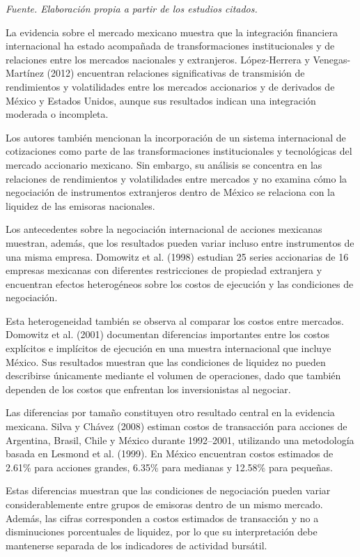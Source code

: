 \emph{Fuente. Elaboración propia a partir de los estudios citados.}

La evidencia sobre el mercado mexicano muestra que la integración financiera internacional ha estado acompañada de transformaciones institucionales y de relaciones entre los mercados nacionales y extranjeros. López-Herrera y Venegas-Martínez (2012) encuentran relaciones significativas de transmisión de rendimientos y volatilidades entre los mercados accionarios y de derivados de México y Estados Unidos, aunque sus resultados indican una integración moderada o incompleta.

Los autores también mencionan la incorporación de un sistema internacional de cotizaciones como parte de las transformaciones institucionales y tecnológicas del mercado accionario mexicano. Sin embargo, su análisis se concentra en las relaciones de rendimientos y volatilidades entre mercados y no examina cómo la negociación de instrumentos extranjeros dentro de México se relaciona con la liquidez de las emisoras nacionales.

Los antecedentes sobre la negociación internacional de acciones mexicanas muestran, además, que los resultados pueden variar incluso entre instrumentos de una misma empresa. Domowitz et al. (1998) estudian 25 series accionarias de 16 empresas mexicanas con diferentes restricciones de propiedad extranjera y encuentran efectos heterogéneos sobre los costos de ejecución y las condiciones de negociación.

Esta heterogeneidad también se observa al comparar los costos entre mercados. Domowitz et al. (2001) documentan diferencias importantes entre los costos explícitos e implícitos de ejecución en una muestra internacional que incluye México. Sus resultados muestran que las condiciones de liquidez no pueden describirse únicamente mediante el volumen de operaciones, dado que también dependen de los costos que enfrentan los inversionistas al negociar.

Las diferencias por tamaño constituyen otro resultado central en la evidencia mexicana. Silva y Chávez (2008) estiman costos de transacción para acciones de Argentina, Brasil, Chile y México durante 1992--2001, utilizando una metodología basada en Lesmond et al. (1999). En México encuentran costos estimados de 2.61\% para acciones grandes, 6.35\% para medianas y 12.58\% para pequeñas.

Estas diferencias muestran que las condiciones de negociación pueden variar considerablemente entre grupos de emisoras dentro de un mismo mercado. Además, las cifras corresponden a costos estimados de transacción y no a disminuciones porcentuales de liquidez, por lo que su interpretación debe mantenerse separada de los indicadores de actividad bursátil.

